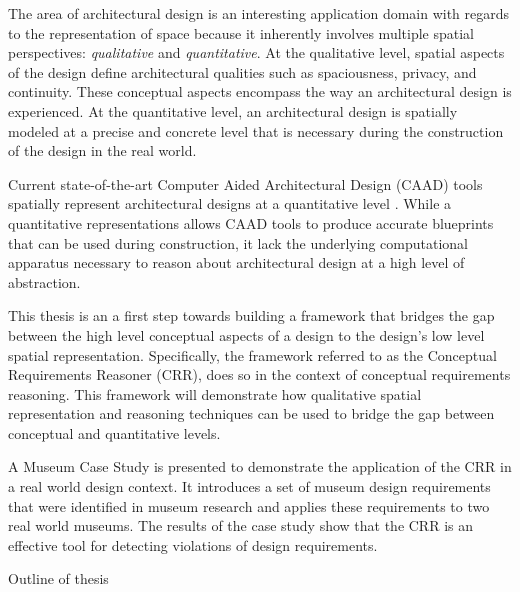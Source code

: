 \documentclass[12pt]{ucthesis}
\begin{document}
The area of architectural design is an interesting application domain with regards to the representation of space because it inherently involves multiple spatial perspectives: \emph{qualitative} and \emph{quantitative}. At the qualitative level, spatial aspects of the design define architectural qualities such as spaciousness, privacy, and continuity. These conceptual aspects encompass the way an architectural design is experienced. At the quantitative level, an architectural design is spatially modeled at a precise and concrete level that is necessary during the construction of the design in the real world.

Current state-of-the-art Computer Aided Architectural Design (CAAD) tools spatially represent architectural designs at a quantitative level \cite{archiCAD} \cite{autoCAD}. While a quantitative representations allows CAAD tools to produce accurate blueprints that can be used during construction, it lack the underlying computational apparatus necessary to reason about architectural design at a high level of abstraction. 

This thesis is an a first step towards building a framework that bridges the gap between the high level conceptual aspects of a design to the design's low level spatial representation. Specifically, the framework referred to as the Conceptual Requirements Reasoner (CRR), does so in the context of conceptual requirements reasoning. This framework will demonstrate how qualitative spatial representation and reasoning techniques can be used to bridge the gap between conceptual and quantitative levels.

A Museum Case Study is presented to demonstrate the application of the CRR in a real world design context. It introduces a set of museum design requirements that were identified in museum research and applies these requirements to two real world museums. The results of the case study show that the CRR is an effective tool for detecting violations of design requirements.

Outline of thesis





\end{document}

